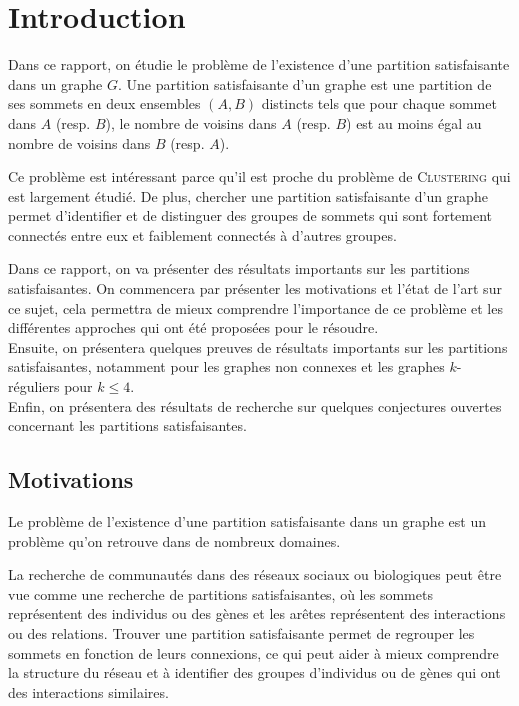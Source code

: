 \section{Introduction}\label{sec:s_1}
Dans ce rapport, on étudie le problème de l'existence d'une partition satisfaisante dans un graphe \(G\).
Une partition satisfaisante d'un graphe est une partition de ses sommets en deux ensembles \((A, B)\) distincts tels que pour chaque sommet dans \(A\) (resp. \(B\)), le nombre de voisins dans \(A\) (resp. \(B\)) est au moins égal au nombre de voisins dans \(B\) (resp. \(A\)).

Ce problème est intéressant parce qu'il est proche du problème de \textsc{Clustering} qui est largement étudié. De plus, chercher une partition satisfaisante d'un graphe permet d'identifier et de distinguer des groupes de sommets qui sont fortement connectés entre eux et faiblement connectés à d'autres groupes.

Dans ce rapport, on va présenter des résultats importants sur les partitions satisfaisantes.
On commencera par présenter les motivations et l'état de l'art sur ce sujet, cela permettra de mieux comprendre l'importance de ce problème et les différentes approches qui ont été proposées pour le résoudre.\\
Ensuite, on présentera quelques preuves de résultats importants sur les partitions satisfaisantes, notamment pour les graphes non connexes et les graphes \(k\)-réguliers pour \(k \leq 4\).\\
Enfin, on présentera des résultats de recherche sur quelques conjectures ouvertes concernant les partitions satisfaisantes.



\subsection{Motivations}\label{subsec:ss1_1}
Le problème de l'existence d'une partition satisfaisante dans un graphe est un problème qu'on retrouve dans de nombreux domaines.

La recherche de communautés dans des réseaux sociaux ou biologiques peut être vue comme une recherche de partitions satisfaisantes, où les sommets représentent des individus ou des gènes et les arêtes représentent des interactions ou des relations. Trouver une partition satisfaisante permet de regrouper les sommets en fonction de leurs connexions, ce qui peut aider à mieux comprendre la structure du réseau et à identifier des groupes d'individus ou de gènes qui ont des interactions similaires.

